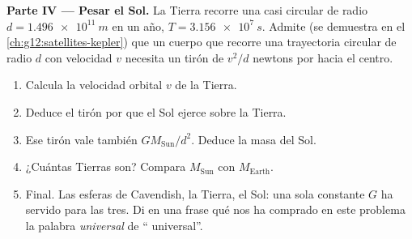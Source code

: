 \begin{problem}
\medskip
\noindent\textbf{Parte IV --- Pesar el Sol.}
La Tierra recorre una  casi circular de radio
$d = \qty{1.496e11}{m}$ en un año, $T = \qty{3.156e7}{s}$. Admite (se
demuestra en el \cref{ch:g12:satellites-kepler}) que un cuerpo que
recorre una trayectoria circular de radio $d$ con velocidad $v$ necesita
un tirón de $v^2/d$ newtons por  hacia el centro.
\begin{enumerate}[resume]
  \item Calcula la velocidad orbital $v$ de la Tierra.
  \item Deduce el tirón por  que el Sol ejerce sobre la Tierra.
  \item Ese tirón vale también $G M_{\text{Sun}} / d^2$. Deduce la masa
        del Sol.
  \item ¿Cuántas Tierras son? Compara $M_{\text{Sun}}$ con
        $M_{\text{Earth}}$.
  \item Final. Las esferas de Cavendish, la Tierra, el Sol: una sola
        constante $G$ ha servido para las tres. Di en una frase qué nos
        ha comprado en este problema la palabra \emph{universal} de
        `` universal''.
\end{enumerate}
\end{problem}
